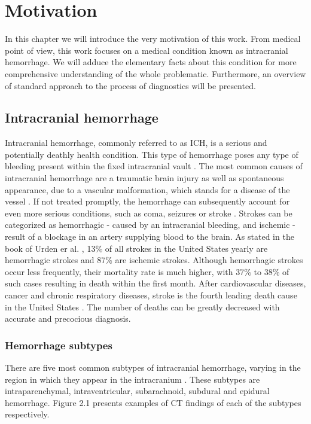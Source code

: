\chapter{Motivation}

In this chapter we will introduce the very motivation of this work. From medical point of view, this work focuses on a medical condition known as intracranial hemorrhage. We will adduce the elementary facts about this condition for more comprehensive understanding of the whole problematic. Furthermore, an overview of standard approach to the process of diagnostics will be presented.

\section{Intracranial hemorrhage}
Intracranial hemorrhage, commonly referred to as ICH, is a serious and potentially deathly health condition. This type of hemorrhage poses any type of bleeding present within the fixed intracranial vault \cite{intracranial1}. The most common causes of intracranial hemorrhage are a traumatic brain injury as well as spontaneous appearance, due to a vascular malformation, which stands for a disease of the vessel \cite{intracranial2}. If not treated promptly, the hemorrhage can subsequently account for even more serious conditions, such as coma, seizures or stroke \cite{intracranial2}. Strokes can be categorized as hemorrhagic - caused by an intracranial bleeding, and ischemic - result of a blockage in an artery supplying blood to the brain. As stated in the book of Urden er al. \cite{ICHbookstats}, 13\% of all strokes in the United States yearly are hemorrhagic strokes and 87\% are ischemic strokes. Although hemorrhagic strokes occur less frequently, their mortality rate is much higher, with 37\% to 38\% of such cases resulting in death within the first month. After cardiovascular diseases, cancer and chronic respiratory diseases, stroke is the fourth leading death cause in the United States \cite{ICHbookstats}. The number of deaths can be greatly decreased with accurate and precocious diagnosis.

\subsection{Hemorrhage subtypes}
There are five most common subtypes of intracranial hemorrhage, varying in the region in which they appear in the intracranium \cite{ICHsubtypes-CT, imagingICH}. These subtypes are intraparenchymal, intraventricular, subarachnoid, subdural and epidural hemorrhage. Figure 2.1 presents examples of CT findings of each of the subtypes respectively.

